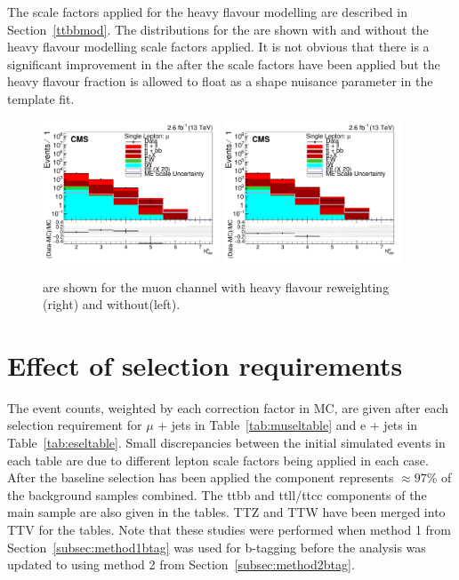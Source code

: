 The scale factors applied for the heavy flavour modelling are described in Section~\ref{ttbbmod}. The distributions for the \nMtags are shown with and without the heavy flavour modelling scale factors applied. It is not obvious that there is a significant improvement in the \nMtags after the scale factors have been applied but the heavy flavour fraction is allowed to float as a shape nuisance parameter in the template fit.

\begin{figure}[ht!]
    \includegraphics[width=0.47\textwidth]{images/Run2/nMtags_StackLogY_HF_wo_reweight.pdf} 
    \includegraphics[width=0.47\textwidth]{images/Run2/nMtags_StackLogY_HF_w_reweight.pdf} 
    \caption{\nMtags are shown for the muon channel with heavy flavour reweighting (right) and without(left).}
    \label{fig:HF_reweight}
\end{figure}

\clearpage

\section{Effect of selection requirements \label{cutflow13}}

The event counts, weighted by each correction factor in MC, are given after each selection requirement for $\mu$ + jets in Table~\ref{tab:museltable} and e + jets in Table~\ref{tab:eseltable}.
Small discrepancies between the initial simulated events in each table are due to different lepton scale factors being applied in each case.
After the baseline selection has been applied the \ttbar component represents $\approx 97\%$ of the background samples combined. The ttbb and ttll/ttcc components of the main \ttbar sample are also given in the tables. TTZ and TTW have been merged into TTV for the tables.
Note that these studies were performed when method 1 from Section~\ref{subsec:method1btag} was used for b-tagging before the analysis was updated to using method 2 from Section~\ref{subsec:method2btag}.

